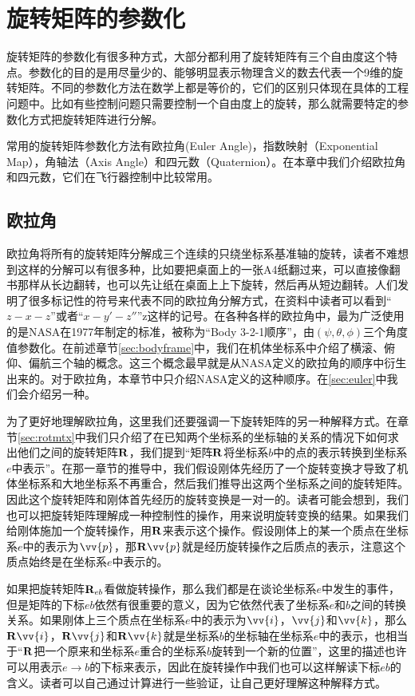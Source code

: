 \documentclass[11pt]{article}
\begin{document}
\section{旋转矩阵的参数化}
旋转矩阵的参数化有很多种方式，大部分都利用了旋转矩阵有三个自由度这个特点。参数化的目的是用尽量少的、能够明显表示物理含义的数去代表一个9维的旋转矩阵。不同的参数化方法在数学上都是等价的，它们的区别只体现在具体的工程问题中。比如有些控制问题只需要控制一个自由度上的旋转，那么就需要特定的参数化方式把旋转矩阵进行分解。

常用的旋转矩阵参数化方法有欧拉角(Euler Angle)，指数映射（Exponential Map），角轴法（Axis Angle）和四元数（Quaternion）。在本章中我们介绍欧拉角和四元数，它们在飞行器控制中比较常用。
\subsection{欧拉角}
欧拉角将所有的旋转矩阵分解成三个连续的只绕坐标系基准轴的旋转，读者不难想到这样的分解可以有很多种，比如要把桌面上的一张A4纸翻过来，可以直接像翻书那样从长边翻转，也可以先让纸在桌面上上下旋转，然后再从短边翻转。人们发明了很多标记性的符号来代表不同的欧拉角分解方式，在资料中读者可以看到“$z-x-z$”或者“$x-y'-z''$”z这样的记号。在各种各样的欧拉角中，最为广泛使用的是NASA在1977年制定的标准，被称为“Body 3-2-1顺序”，由$(\psi, \theta, \phi)$三个角度值参数化\cite{nasa}。在前述章节\ref{sec:bodyframe}中，我们在机体坐标系中介绍了横滚、俯仰、偏航三个轴的概念。这三个概念最早就是从NASA定义的欧拉角的顺序中衍生出来的。对于欧拉角，本章节中只介绍NASA定义的这种顺序。在\ref{sec:euler}中我们会介绍另一种。

为了更好地理解欧拉角，这里我们还要强调一下旋转矩阵的另一种解释方式。在章节\ref{sec:rotmtx}中我们只介绍了在已知两个坐标系的坐标轴的关系的情况下如何求出他们之间的旋转矩阵${\bf R}$，我们提到“矩阵${\bf R}$将坐标系$b$中的点的表示转换到坐标系$e$中表示”。在那一章节的推导中，我们假设刚体先经历了一个旋转变换才导致了机体坐标系和大地坐标系不再重合，然后我们推导出这两个坐标系之间的旋转矩阵。因此这个旋转矩阵和刚体首先经历的旋转变换是一对一的。读者可能会想到，我们也可以把旋转矩阵理解成一种控制性的操作，用来说明旋转变换的结果。如果我们给刚体施加一个旋转操作，用${\bf R}$来表示这个操作。假设刚体上的某一个质点在坐标系$e$中的表示为$\vv{p}$，那${\bf R}\vv{p}$就是经历旋转操作之后质点的表示，注意这个质点始终是在坐标系$e$中表示的。

如果把旋转矩阵${\bf R}_{eb}$看做旋转操作，那么我们都是在谈论坐标系$e$中发生的事件，但是矩阵的下标$eb$依然有很重要的意义，因为它依然代表了坐标系$e$和$b$之间的转换关系。如果刚体上三个质点在坐标系$e$中的表示为$\vv{i}$，$\vv{j}$和$\vv{k}$，那么${\bf R}\vv{i}$，${\bf R}\vv{j}$和${\bf R}\vv{k}$就是坐标系$b$的坐标轴在坐标系$e$中的表示，也相当于“${\bf R}$把一个原来和坐标系$e$重合的坐标系$b$旋转到一个新的位置”，这里的描述也许可以用表示$e\rightarrow b$的下标来表示，因此在旋转操作中我们也可以这样解读下标$eb$的含义。读者可以自己通过计算进行一些验证，让自己更好理解这种解释方式。
\end{document}
